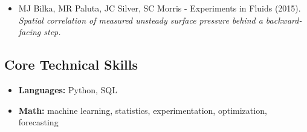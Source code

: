 \documentclass[10pt,letterpaper]{article}
\begin{document}
\begin{paracol}{2}
\begin{rightcolumn}
\begin{itemize}[label={--}, leftmargin={.15in}, rightmargin={.2in}]
    	\item
    		MJ Bilka, MR Paluta, JC Silver, SC Morris - Experiments in Fluids (2015). \emph{Spatial correlation of measured unsteady surface pressure behind a backward-facing step.}

    \end{itemize}

\subsection*{Core Technical Skills}

    \begin{itemize}[label={--}, leftmargin={.15in}, rightmargin={.2in}]
    	\parskip=0.1em
        \item
    	\textbf{Languages:} Python, SQL
    	\item
    	\textbf{Math:} machine learning, statistics, experimentation, optimization, forecasting

    \end{itemize}

\end{rightcolumn}
\end{paracol}
\end{document}

